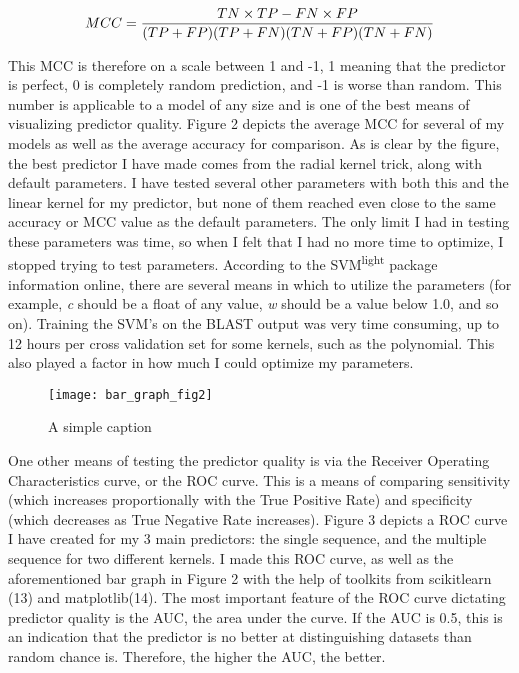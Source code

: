 \documentclass[final]{article}
\begin{document}
 \[
\\MCC=\frac{TN \times TP - FN \times FP}{(TP+FP)(TP+FN)(TN+FP)(TN+FN)}
\] 

This MCC is therefore on a scale between 1 and -1, 1 meaning that the predictor is perfect, 0 is completely random prediction, and -1 is worse than random. This number is applicable to a model of any size and is one of the best means of visualizing predictor quality. Figure 2 depicts the average MCC for several of my models as well as the average accuracy for comparison. As is clear by the figure, the best predictor I have made comes from the radial kernel trick, along with default parameters. I have tested several other parameters with both this and the linear kernel for my predictor, but none of them reached even close to the same accuracy or MCC value as the default parameters. The only limit I had in testing these parameters was time, so when I felt that I had no more time to optimize, I stopped trying to test parameters. According to the SVM\textsuperscript{light} package information online, there are several means in which to utilize the parameters (for example, \textit{c} should be a float of any value, \textit{w} should be a value below 1.0, and so on). Training the SVM's on the BLAST output was very time consuming, up to 12 hours per cross validation set for some kernels, such as the polynomial. This also played a factor in how much I could optimize my parameters.



\begin{figure}
\centering
\texttt{[image: bar\_graph\_fig2]}
\caption{A simple caption \label{bar_graph}}
\end{figure}

One other means of testing the predictor quality is via the Receiver Operating Characteristics curve, or the ROC curve. This is a means of comparing sensitivity (which increases proportionally with the True Positive Rate) and specificity (which decreases as True Negative Rate increases). Figure 3 depicts a ROC curve I have created for my 3 main predictors: the single sequence, and the multiple sequence for two different kernels. I made this ROC curve, as well as the aforementioned bar graph in Figure 2 with the help of toolkits from scikitlearn (13) and matplotlib(14). The most important feature of the ROC curve dictating predictor quality is the AUC, the area under the curve. If the AUC is 0.5, this is an indication that the predictor is no better at distinguishing datasets than random chance is. Therefore, the higher the AUC, the better. 
\end{document}
